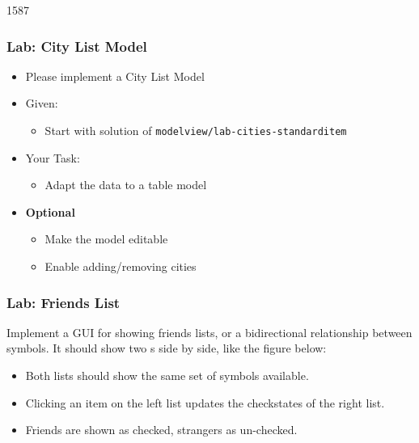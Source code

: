 \begin{slide}{1587}
\frametitle{Lab: City List Model}
  \begin{itemize}
  \item Please implement a City List Model
  \item Given:
    \begin{itemize}
    \item Start with solution of \texttt{modelview/lab-cities-standarditem}
    \end{itemize}
  \item Your Task:
    \begin{itemize}
    \item Adapt the data to a table model
    \end{itemize}
  \item \textbf{Optional}
    \begin{itemize}
    \item Make the model editable
    \item Enable adding/removing cities
   \end{itemize}
 \end{itemize}
\end{slide}

\begin{slide}[fragile]
\frametitle{Lab: Friends List}
Implement a GUI for showing friends lists, or a bidirectional relationship between symbols.
It should show two s side by side, like the figure below:


\begin{itemize}
\item  Both lists should show the same set of symbols available.
\item  Clicking an item on the left list updates the checkstates of the right list.
\item  Friends are shown as checked, strangers as un-checked.
\end{itemize}
\end{slide}

